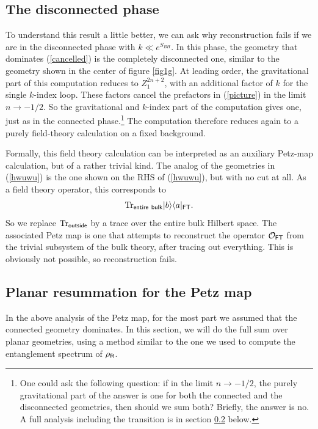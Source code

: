 \documentclass[11pt]{article}
\newcommand{\be}{\begin{equation}}
\newcommand{\ee}{\end{equation}}
\numberwithin{equation}{section}
\def\tr{\text{Tr}}
\begin{document}
\subsection{The disconnected phase}
To understand this result a little better, we can ask why reconstruction fails if we are in the disconnected phase with $k \ll e^{S_{BH}}$. In this phase, the geometry that dominates (\ref{cancelled}) is the completely disconnected one, similar to the geometry shown in the center of figure \ref{fig1g}. At leading order, the gravitational part of this computation reduces to $Z_1^{2n+2}$, with an additional factor of $k$ for the single $k$-index loop. These factors cancel the prefactors in (\ref{picture}) in the limit $n\rightarrow -1/2$. So the gravitational and $k$-index part of the computation gives one, just as in the connected phase.\footnote{One could ask the following question: if in the limit $n\rightarrow -1/2$, the purely gravitational part of the answer is one for both the connected and the disconnected geometries, then should we sum both? Briefly, the answer is no. A full analysis including the transition is in section \ref{sec:nonperPetz} below.} The computation therefore reduces again to a purely field-theory calculation on a fixed background.

Formally, this field theory calculation can be interpreted as an auxiliary Petz-map calculation, but of a rather trivial kind. The analog of the geometries in (\ref{hwuwu}) is the one shown on the RHS of (\ref{hwuwu}), but with no cut at all. As a field theory operator, this corresponds to 
\be
\tr_{\sf{entire \ bulk}}|b\rangle\langle a|_{\sf{FT}}.
\ee
So we replace $\tr_{\sf{outside}}$ by a trace over the entire bulk Hilbert space. The associated Petz map is one that attempts to reconstruct the operator $\mathcal{O}_{\sf{FT}}$ from the trivial subsystem of the bulk theory, after tracing out everything. This is obviously not possible, so reconstruction fails.


\subsection{Planar resummation for the Petz map}\label{sec:nonperPetz}
In the above analysis of the Petz map, for the most part we assumed that the connected geometry dominates. In this section, we will do the full sum over planar geometries, using a method similar to the one we used to compute the entanglement spectrum of $\rho_{\sf{R}}$. 
\end{document}
